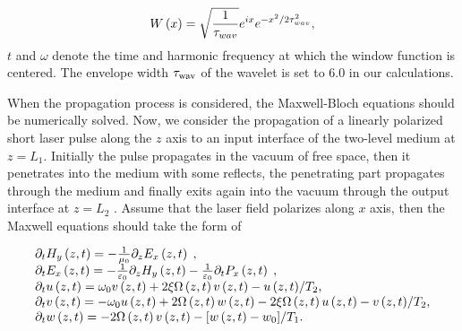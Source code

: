 \documentclass[10pt,letterpaper]{article}
\begin{document}
\begin{equation}
{{W}}\left( x \right) = \sqrt {\frac{{\rm{1}}}{{{\tau _{wav}}}}} {e^{ix}}{e^{ - {x^2}/2\tau _{wav}^2}},
\label{eq9}
\end{equation}
$ t $ and $ \omega $ denote the time and harmonic frequency at which the window function is centered. The envelope width $ \tau_{\rm{wav}} $ of the wavelet is set to 6.0 in our calculations.

When the propagation process is considered, the Maxwell-Bloch equations should be numerically solved. Now, we consider the propagation of a linearly polarized short laser pulse along the $ z $ axis to an input interface of the two-level medium at $ z=L_{1} $. Initially the pulse propagates in the vacuum of free space, then it penetrates into the medium with some reflects, the penetrating part propagates through the medium and finally exits again into the vacuum through the output interface at $ z=L_{2} $ \cite{Kalosha-Two-Level-PRL-1999}. Assume that the laser field polarizes along  $ x $ axis, then the Maxwell equations should take the form of

\begin{equation}
\begin{array}{l}
{\partial _t}{H_y}\left( {z,t} \right) =  - \frac{1}{{{\mu _0}}}{\partial _z}{E_x}\left( {z,t} \right)\;,\\
{\partial _t}{E_x}\left( {z,t} \right) =  - \frac{1}{{{\varepsilon _0}}}{\partial _z}{H_y}\left( {z,t} \right) - \frac{1}{{{\varepsilon _0}}}{\partial _t}{P_x}\left( {z,t} \right)\;,\\
{\partial _t}u\left( {z,t} \right) = {\omega _0}v\left( {z,t} \right) + 2\xi \Omega \left( {z,t} \right)v\left( {z,t} \right) - {{u\left( {z,t} \right)} \mathord{\left/
		{\vphantom {{u\left( {z,t} \right)} {{T_2}}}} \right.
		\kern-\nulldelimiterspace} {{T_2}}},\\
{\partial _t}v\left( {z,t} \right) =  - {\omega _0}u\left( {z,t} \right) + 2\Omega \left( {z,t} \right)w\left( {z,t} \right) - 2\xi \Omega \left( {z,t} \right)u\left( {z,t} \right) - {{v\left( {z,t} \right)} \mathord{\left/
		{\vphantom {{v\left( {z,t} \right)} {{T_2}}}} \right.
		\kern-\nulldelimiterspace} {{T_2}}},\\
{\partial _t}w\left( {z,t} \right) =  - 2\Omega \left( {z,t} \right)v\left( {z,t} \right) - {{\left[ {w\left( {z,t} \right) - {w_{0}}} \right]} \mathord{\left/
		{\vphantom {{\left[ {w\left( {z,t} \right) - {w_{0}}} \right]} {{T_1}}}} \right.
		\kern-\nulldelimiterspace} {{T_1}}}.
\end{array}
\label{eq10}
\end{equation}
\end{document}
